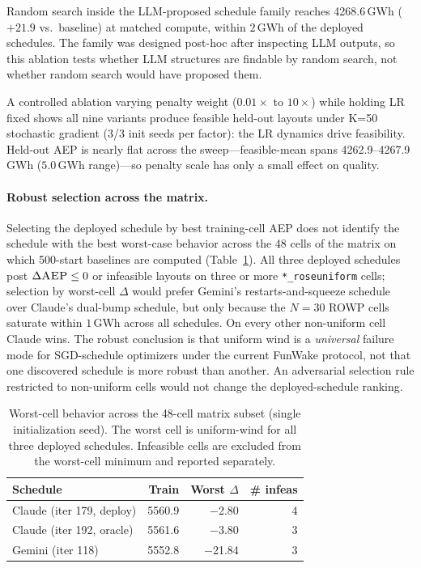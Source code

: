 \documentclass{article}
\begin{document}
Random search inside the LLM-proposed schedule family reaches
4268.6\,GWh ($+21.9$ vs.\ baseline) at matched compute, within
$2$\,GWh of the deployed schedules. The family was designed post-hoc
after inspecting LLM outputs, so this ablation tests whether LLM
structures are findable by random search, not whether random search
would have proposed them.

A controlled ablation varying penalty weight ($0.01\times$ to
$10\times$) while holding LR fixed shows all nine variants produce
feasible held-out layouts under K=50 stochastic gradient (3/3 init
seeds per factor): the LR dynamics drive feasibility. Held-out
AEP is nearly flat across the sweep---feasible-mean spans
4262.9--4267.9\,GWh ($5.0$\,GWh range)---so penalty scale has only
a small effect on quality.

\paragraph{Robust selection across the matrix.}
Selecting the deployed schedule by best training-cell AEP does not
identify the schedule with the best worst-case behavior across the
48 cells of the matrix on which 500-start baselines are computed
(Table~\ref{tab:robust}). All three deployed schedules post
$\Delta\textsc{AEP}\le 0$ or infeasible layouts on three or more
\texttt{*\_roseuniform} cells; selection by worst-cell $\Delta$
would prefer Gemini's restarts-and-squeeze schedule over Claude's
dual-bump schedule, but only because the $N{=}30$ ROWP cells
saturate within $1$\,GWh across all schedules. On every other
non-uniform cell Claude wins. The robust conclusion is that
uniform wind is a \emph{universal} failure mode for SGD-schedule
optimizers under the current FunWake protocol, not that one
discovered schedule is more robust than another. An adversarial
selection rule restricted to non-uniform cells would not change
the deployed-schedule ranking.

\begin{table}[t]
\caption{Worst-cell behavior across the 48-cell matrix subset (single
initialization seed). The worst cell is uniform-wind for all three
deployed schedules. Infeasible cells are excluded from the
worst-cell minimum and reported separately.}
\label{tab:robust}
\vskip 0.1in
\centering
\begin{small}
\begin{sc}
\begin{tabular}{lrrr}
\toprule
Schedule & Train & Worst $\Delta$ & \# infeas \\
\midrule
Claude (iter 179, deploy) & 5560.9 & $-$2.80 & 4 \\
Claude (iter 192, oracle) & 5561.6 & $-$3.80 & 3 \\
Gemini (iter 118)         & 5552.8 & $-$21.84 & 3 \\
\bottomrule
\end{tabular}
\end{sc}
\end{small}
\vskip -0.1in
\end{table}
\end{document}
